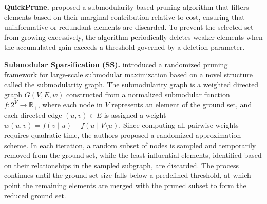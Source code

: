 
\textbf{QuickPrune.} \cite{pmlr-v258-nath25a} proposed a submodularity-based pruning algorithm that filters elements based on their marginal contribution relative to cost, ensuring that uninformative or redundant elements are discarded. To prevent the selected set from growing excessively, the algorithm periodically deletes weaker elements when the accumulated gain exceeds a threshold governed by a deletion parameter. 

\textbf{Submodular Sparsification (SS).}  \citet{zhou2017scaling} introduced a randomized pruning framework for large-scale submodular maximization based on a novel structure called the submodularity graph. The submodularity graph is a weighted directed graph \( G(V, E, w) \) constructed from a normalized submodular function \( f: 2^{V} \rightarrow \mathbb{R}_+ \), where each node in \( V \) represents an element of the ground set, and each directed edge \( (u, v) \in E \) is assigned a weight \( w(u, v) = f(v \mid u) - f(u \mid V \setminus u) \). Since computing all pairwise weights requires quadratic time, the authors proposed a randomized approximation scheme. In each iteration, a random subset of nodes is sampled and temporarily removed from the ground set, while the least influential elements, identified based on their relationships in the sampled subgraph, are discarded. The process continues until the ground set size falls below a predefined threshold, at which point the remaining elements are merged with the pruned subset to form the reduced ground set.
 


